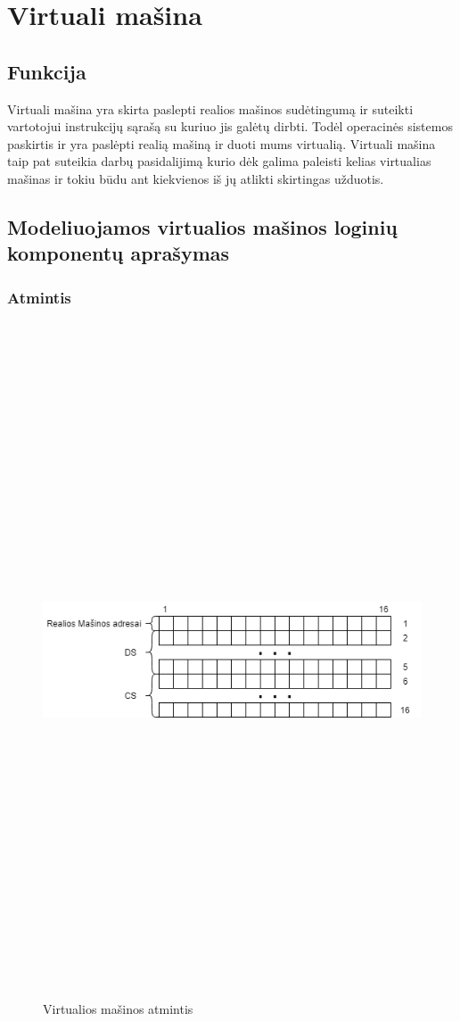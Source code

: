 \documentclass[oneside]{VUMIFPSkursinis}
\begin{document}
\section{Virtuali mašina}

\subsection{Funkcija}
Virtuali mašina yra skirta paslepti realios mašinos sudėtingumą ir suteikti vartotojui instrukcijų sąrašą su kuriuo jis galėtų dirbti. Todėl operacinės sistemos paskirtis ir yra paslėpti realią mašiną ir duoti mums virtualią. Virtuali mašina taip pat suteikia darbų pasidalijimą kurio dėk galima paleisti kelias virtualias mašinas ir tokiu būdu ant kiekvienos iš jų atlikti skirtingas užduotis.

 \subsection{Modeliuojamos virtualios mašinos loginių komponentų aprašymas}
	\subsubsection{Atmintis}
	\begin{figure}[H]
		\centering	
	\includegraphics[width=18cm,height=20cm,keepaspectratio]{VMAtmintis.png}
	\caption{Virtualios mašinos atmintis}
	\label{fig:Virtualios mašinos atmintis}
\end{figure}
\end{document}

